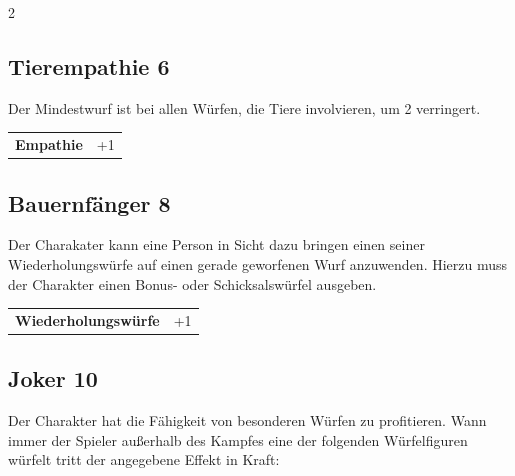 \begin{multicols}{2}
\begin{tcolorbox}

\end{tcolorbox}

\begin{tcolorbox}
    \subsection*{Tierempathie \hfill \small{6 }}
    \tcblower
Der Mindestwurf ist bei allen Würfen, die Tiere involvieren, um 2 verringert.


\vspace{3mm}

\begin{tabular}{@{}ll@{}}
    \textbf{Empathie} & +1\\
\end{tabular}


\end{tcolorbox}

\begin{tcolorbox}
    \subsection*{Bauernfänger \hfill \small{8 }}
    \tcblower
Der Charakater kann eine Person in Sicht dazu bringen einen seiner Wiederholungswürfe auf einen gerade geworfenen Wurf anzuwenden. Hierzu muss der Charakter einen Bonus- oder Schicksalswürfel ausgeben.


\vspace{3mm}

\begin{tabular}{@{}ll@{}}
    \textbf{Wiederholungswürfe} & +1\\
\end{tabular}


\end{tcolorbox}

\begin{tcolorbox}
    \subsection*{Joker \hfill \small{10 }}
    \tcblower
Der Charakter hat die Fähigkeit von besonderen Würfen zu profitieren. Wann immer der Spieler außerhalb des Kampfes eine der folgenden Würfelfiguren würfelt tritt der angegebene Effekt in Kraft:


\end{tcolorbox}
\end{multicols}
